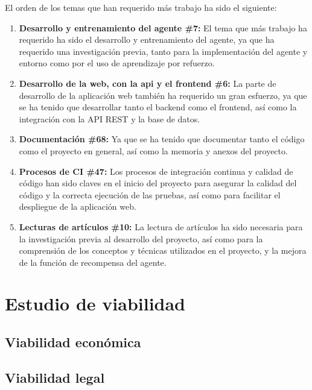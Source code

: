 
El orden de los temas que han requerido más trabajo ha sido el siguiente:
\begin{enumerate}
    \item \textbf{Desarrollo y entrenamiento del agente \#7:} El tema que más trabajo ha requerido ha sido el desarrollo y entrenamiento del agente, ya que ha requerido una investigación previa, tanto para la implementación del agente y entorno como por el uso de aprendizaje por refuerzo.
    \item \textbf{Desarrollo de la web, con la api y el frontend \#6:} La parte de desarrollo de la aplicación web también ha requerido un gran esfuerzo, ya que se ha tenido que desarrollar tanto el backend como el frontend, así como la integración con la API REST y la base de datos.
    \item \textbf{Documentación \#68:}  Ya que se ha tenido que documentar tanto el código como el proyecto en general, así como la memoria y anexos del proyecto.
    \item \textbf{Procesos de CI \#47:} Los procesos de integración continua y calidad de código han sido claves en el inicio del proyecto para asegurar la calidad del código y la correcta ejecución de las pruebas, así como para facilitar el despliegue de la aplicación web.
    \item \textbf{Lecturas de artículos \#10:} La lectura de artículos ha sido necesaria para la investigación previa al desarrollo del proyecto, así como para la comprensión de los conceptos y técnicas utilizados en el proyecto, y la mejora de la función de recompensa del agente.
\end{enumerate}

\section{Estudio de viabilidad}

\subsection{Viabilidad económica}

\subsection{Viabilidad legal}


